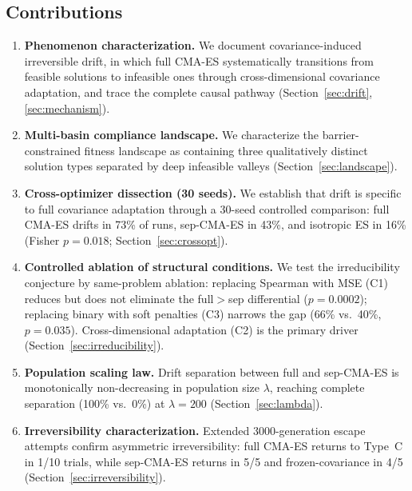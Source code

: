 \documentclass[twoside,11pt]{article}
\begin{document}
\subsection{Contributions}

\begin{enumerate}
\item \textbf{Phenomenon characterization.} We document covariance-induced
  irreversible drift, in which full CMA-ES systematically transitions from
  feasible solutions to infeasible ones through cross-dimensional covariance
  adaptation, and trace the complete causal pathway (Section~\ref{sec:drift},
  \ref{sec:mechanism}).

\item \textbf{Multi-basin compliance landscape.} We characterize the
  barrier-constrained fitness landscape as containing three qualitatively
  distinct solution types separated by deep infeasible valleys
  (Section~\ref{sec:landscape}).

\item \textbf{Cross-optimizer dissection (30 seeds).} We establish that drift
  is specific to full covariance adaptation through a 30-seed controlled
  comparison: full CMA-ES drifts in 73\% of runs, sep-CMA-ES in 43\%,
  and isotropic ES in 16\% (Fisher $p = 0.018$; Section~\ref{sec:crossopt}).

\item \textbf{Controlled ablation of structural conditions.} We test the
  irreducibility conjecture by same-problem ablation: replacing Spearman with
  MSE (C1) reduces but does not eliminate the full$>$sep differential
  ($p = 0.0002$); replacing binary with soft penalties (C3) narrows the gap
  (66\% vs.\ 40\%, $p = 0.035$). Cross-dimensional adaptation (C2) is the
  primary driver (Section~\ref{sec:irreducibility}).

\item \textbf{Population scaling law.} Drift separation between full and
  sep-CMA-ES is monotonically non-decreasing in population size $\lambda$, reaching
  complete separation (100\% vs.\ 0\%) at $\lambda = 200$
  (Section~\ref{sec:lambda}).

\item \textbf{Irreversibility characterization.} Extended 3000-generation
  escape attempts confirm asymmetric irreversibility: full CMA-ES returns
  to Type~C in 1/10 trials, while sep-CMA-ES returns in 5/5 and
  frozen-covariance in 4/5 (Section~\ref{sec:irreversibility}).
\end{enumerate}
\end{document}
